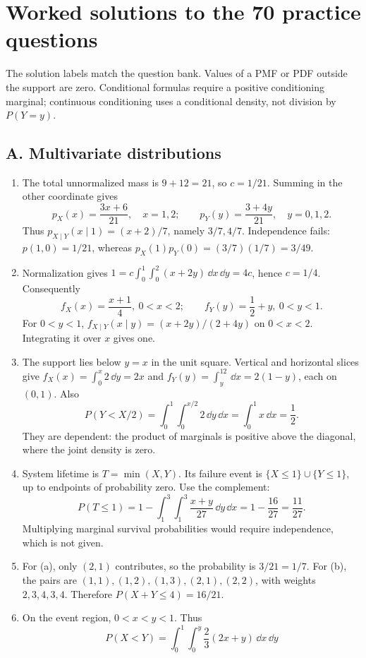 \clearpage
\section{Worked solutions to the 70 practice questions}
The solution labels match the question bank. Values of a PMF or PDF outside the support are zero. Conditional formulas require a positive conditioning marginal; continuous conditioning uses a conditional density, not division by $P(Y=y)$.

\subsection{A. Multivariate distributions}
\begin{enumerate}[label=\textbf{A\arabic*.},leftmargin=*,itemsep=1em]
\item The total unnormalized mass is $9+12=21$, so $c=1/21$. Summing in the other coordinate gives
\[
p_X(x)=\frac{3x+6}{21},\quad x=1,2;\qquad
p_Y(y)=\frac{3+4y}{21},\quad y=0,1,2.
\]
Thus $p_{X\mid Y}(x\mid1)=(x+2)/7$, namely $3/7,4/7$. Independence fails: $p(1,0)=1/21$, whereas $p_X(1)p_Y(0)=(3/7)(1/7)=3/49$.
\item Normalization gives $1=c\int_0^1\int_0^2(x+2y)\,\dd x\,\dd y=4c$, hence $c=1/4$. Consequently
\[
f_X(x)=\frac{x+1}{4},\ 0<x<2;\qquad
f_Y(y)=\frac12+y,\ 0<y<1.
\]
For $0<y<1$, $f_{X\mid Y}(x\mid y)=(x+2y)/(2+4y)$ on $0<x<2$. Integrating it over $x$ gives one.
\item The support lies below $y=x$ in the unit square. Vertical and horizontal slices give $f_X(x)=\int_0^x2\,\dd y=2x$ and $f_Y(y)=\int_y^12\,\dd x=2(1-y)$, each on $(0,1)$. Also
\[
P(Y<X/2)=\int_0^1\int_0^{x/2}2\,\dd y\,\dd x=\int_0^1x\,\dd x=\frac12.
\]
They are dependent: the product of marginals is positive above the diagonal, where the joint density is zero.
\item System lifetime is $T=\min(X,Y)$. Its failure event is $\{X\leq1\}\cup\{Y\leq1\}$, up to endpoints of probability zero. Use the complement:
\[
P(T\leq1)=1-\int_1^3\int_1^3\frac{x+y}{27}\,\dd y\,\dd x
=1-\frac{16}{27}=\frac{11}{27}.
\]
Multiplying marginal survival probabilities would require independence, which is not given.
\item For (a), only $(2,1)$ contributes, so the probability is $3/21=1/7$. For (b), the pairs are $(1,1),(1,2),(1,3),(2,1),(2,2)$, with weights $2,3,4,3,4$. Therefore $P(X+Y\leq4)=16/21$.
\item On the event region, $0<x<y<1$. Thus
\[
P(X<Y)=\int_0^1\int_0^y\frac23(2x+y)\,\dd x\,\dd y
\]
\end{enumerate}
